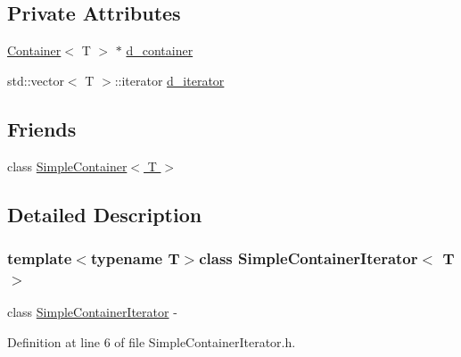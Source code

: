 \subsection*{Private Attributes}
\begin{DoxyCompactItemize}
\item 
\hyperlink{class_container}{Container}$<$ T $>$ $\ast$ \hyperlink{class_simple_container_iterator_a179c3b6ee590cd5476d6dee1c7b9a90e}{d\_\-container}
\item 
std::vector$<$ T $>$::iterator \hyperlink{class_simple_container_iterator_ad5523f803739cceb9f42701bca99aef5}{d\_\-iterator}
\end{DoxyCompactItemize}
\subsection*{Friends}
\begin{DoxyCompactItemize}
\item 
class \hyperlink{class_simple_container_iterator_af3eda3b215741021fb668d573cf344f3}{SimpleContainer$<$ T $>$}
\end{DoxyCompactItemize}


\subsection{Detailed Description}
\subsubsection*{template$<$typename T$>$class SimpleContainerIterator$<$ T $>$}

class \hyperlink{class_simple_container_iterator}{SimpleContainerIterator} -\/ 

Definition at line 6 of file SimpleContainerIterator.h.



